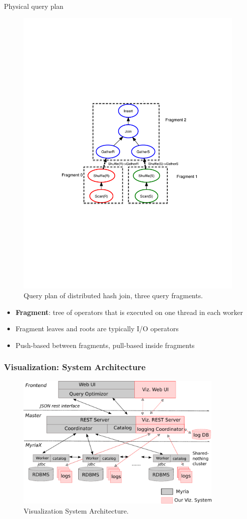 \documentclass[mathserif,serif]{beamer}
\begin{document}
\begin{frame}{Physical query plan}
  \begin{figure}
   \begin{center}
       \includegraphics[width=.6\textwidth]{join}
     \end{center}
    \caption{Query plan of distributed hash join, three query fragments.}
  \end{figure}
  \begin{itemize}
   \item \textbf{Fragment}: tree of operators that is executed on one thread in each worker
  	\item Fragment leaves and roots are typically I/O operators
    \item Push\--based between fragments, pull\--based inside fragments
  \end{itemize}
\end{frame}

\begin{frame}
  \frametitle{Visualization: System Architecture}
  \begin{figure}
  	 \begin{center}
       \includegraphics[width=0.9\textwidth]{viz_arch.pdf}
     \end{center}
     \caption{Visualization System Architecture.}
    \label{fig:viz_arc}
  \end{figure}
\end{frame}
\end{document}
